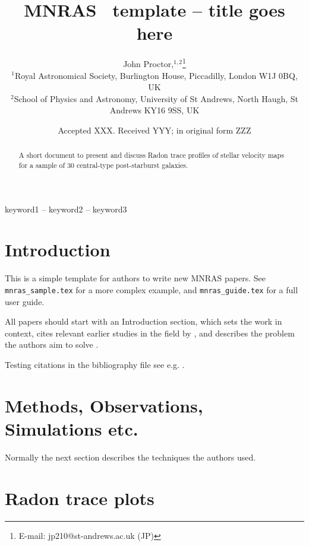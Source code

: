 \documentclass[fleqn,usenatbib]{mnras}
\title[Radon trace profiles of PSB galaxies]{MNRAS \LaTeXe\ template -- title goes here}
\author[J. Proctor et al.]{
John Proctor,$^{1,2}$\thanks{E-mail: jp210@st-andrews.ac.uk (JP)}
\\
$^{1}$Royal Astronomical Society, Burlington House, Piccadilly, London W1J 0BQ, UK\\
$^{2}$School of Physics and Astronomy, University of St Andrews, North Haugh, St Andrews KY16 9SS, UK\\
}
\date{Accepted XXX. Received YYY; in original form ZZZ}
\begin{document}
\label{firstpage}
\pagerange{\pageref{firstpage}--\pageref{lastpage}}
\maketitle

\begin{abstract}
A short document to present and discuss Radon trace profiles of stellar velocity maps for a sample of 30 central-type post-starburst galaxies. 
\end{abstract}

\begin{keywords}
keyword1 -- keyword2 -- keyword3
\end{keywords}



\section{Introduction}

This is a simple template for authors to write new MNRAS papers.
See \texttt{mnras\_sample.tex} for a more complex example, and \texttt{mnras\_guide.tex}
for a full user guide.

All papers should start with an Introduction section, which sets the work
in context, cites relevant earlier studies in the field by \citet{Others2013},
and describes the problem the authors aim to solve \citep[e.g.][]{Author2012}.

Testing citations in the bibliography file see e.g. \citet{2019ApJ...872...76N}.

\section{Methods, Observations, Simulations etc.}

Normally the next section describes the techniques the authors used.

\section{Radon trace plots}
\label{Radon-trace-plots}
\end{document}
